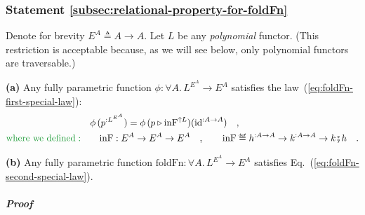 \subsubsection{Statement \label{subsec:relational-property-for-foldFn}\ref{subsec:relational-property-for-foldFn}}

Denote for brevity $E^{A}\triangleq A\rightarrow A$. Let $L$ be
any \emph{polynomial} functor. (This restriction is acceptable because,
as we will see below, only polynomial functors are traversable.)

\textbf{(a)} Any fully parametric function $\phi:\forall A.\,L^{E^{A}}\rightarrow E^{A}$
satisfies the law~(\ref{eq:foldFn-first-special-law}):
\begin{align}
 & \phi\,(p^{:L^{E^{A}}})=\phi\,(p\triangleright\text{inF}^{\uparrow L})(\text{id}^{:A\rightarrow A})\quad,\label{eq:first-special-law-of-phi}\\
{\color{greenunder}\text{where we defined}:}\quad & \quad\text{inF}:E^{A}\rightarrow E^{A}\rightarrow E^{A}\quad,\quad\quad\text{inF}\triangleq h^{:A\rightarrow A}\rightarrow k^{:A\rightarrow A}\rightarrow k\bef h\quad.\nonumber 
\end{align}

\textbf{(b)} Any fully parametric function $\text{foldFn}:\forall A.\,L^{E^{A}}\rightarrow E^{A}$
satisfies Eq.~(\ref{eq:foldFn-second-special-law}).

\subparagraph{Proof}


